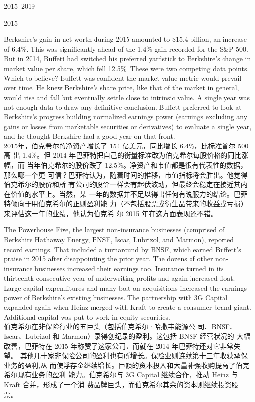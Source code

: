 \begin{chapter}{2015--2019}
\begin{section}{2015}
\begin{verseparallel}
  {
    Berkshire's gain in net worth during 2015 amounted to \$15.4 billion, an
    increase of 6.4\%. This was significantly ahead of the 1.4\% gain recorded
    for the S\&P 500. But in 2014, Buffett had switched his preferred yardstick
    to Berkshire's change in market value per share, which fell 12.5\%. These
    were two competing data points. Which to believe? Buffett was confident the
    market value metric would prevail over time. He knew Berkshire's share
    price, like that of the market in general, would rise and fall but
    eventually settle close to intrinsic value. A single year was not enough
    data to draw any definitive conclusion. Buffett preferred to look at
    Berkshire's progress building normalized earnings power (earnings excluding
    any gains or losses from marketable securities or derivatives) to evaluate a
    single year, and he thought Berkshire had a good year on that front. \\
  }
  {
    2015年，伯克希尔的净资产增长了 154 亿美元，同比增长 6.4\%，比标准普尔 500 高
    出 1.4\%。但 2014 年巴菲特把自己的衡量标准改为伯克希尔每股价格的同比涨幅，而
    当年伯克希尔的股价跌了 12.5\%。净资产和市值都是很有代表性的数据，那么哪一个更
    可信？巴菲特认为，随着时间的推移，市值指标将会胜出。他觉得伯克希尔的股价和所
    有公司的股价一样会有起伏波动，但最终会稳定在接近其内在价值的水平上。当然，某
    一年的数据并不足以得出任何有说服力的结论。巴菲特倾向于用伯克希尔的正则盈利能
    力（不包括股票或衍生品带来的收益或亏损）来评估这一年的业绩，他认为伯克希
    尔 2015 年在这方面表现还不错。
  }
\end{verseparallel}

\begin{verseparallel}
  {
    The Powerhouse Five, the largest non-insurance businesses (comprised of
    Berkshire Hathaway Energy, BNSF, Iscar, Lubrizol, and Marmon), reported
    record earnings. That included a turnaround by BNSF, which earned Buffett's
    praise in 2015 after disappointing the prior year. The dozens of other
    non-insurance businesses increased their earnings too. Insurance turned in
    its thirteenth consecutive year of underwriting profits and again increased
    float. Large capital expenditures and many bolt-on acquisitions increased
    the earnings power of Berkshire's existing businesses. The partnership with
    3G Capital expanded again when Heinz merged with Kraft to create a consumer
    brand giant. Additional capital was put to work in equity securities. \\
  }
  {
    伯克希尔在非保险行业的五巨头（包括伯克希尔·哈撒韦能源公
    司、BNSF、Iscar、Lubrizol 和 Marmon）录得创纪录的盈利。这包括 BNSF 经营状况的
    大幅改善，巴菲特在 2015 年称赞了这家公司，而就在 2014 年巴菲特还对它非常失望。
    其他几十家非保险公司的盈利也有所增长。保险业则连续第十三年收获承保业务的盈利,从
    而使浮存金继续增长。巨额的资本投入和大量补强收购提高了伯克希尔现有业务的盈利
    能力。伯克希尔与 3G Capital 继续合作，推动 Heinz 与 Kraft 合并，形成了一个消
    费品牌巨头，而伯克希尔其余的资本则继续投资股票。
  }
\end{verseparallel}


\end{section}
\end{chapter}
